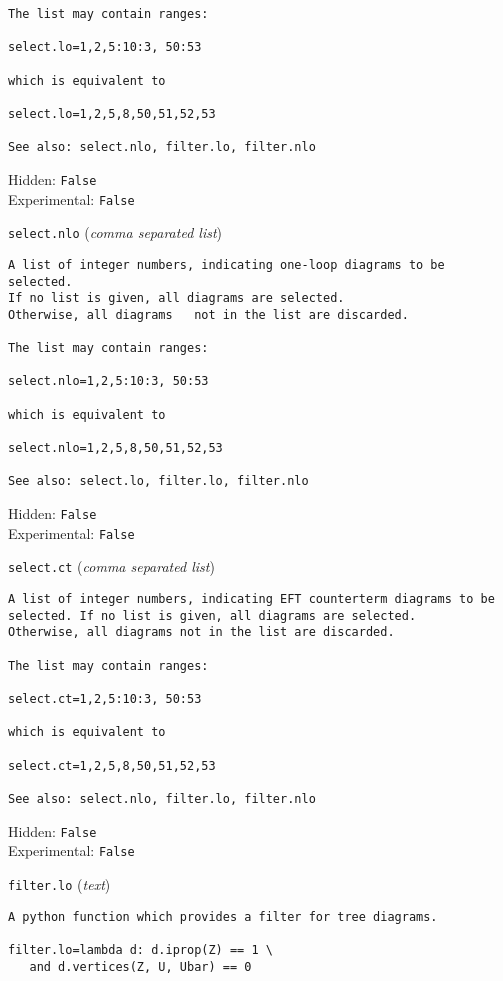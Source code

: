 \begin{basedescript}{\desclabelstyle{\pushlabel}}
\begin{verbatim}
The list may contain ranges:

select.lo=1,2,5:10:3, 50:53

which is equivalent to

select.lo=1,2,5,8,50,51,52,53

See also: select.nlo, filter.lo, filter.nlo
\end{verbatim}
Hidden: \verb|False|
\\Experimental: \verb|False|
\\\item[\colorbox{gray!30}{\texttt{select.nlo}}] (\textit{comma separated list})
\begin{verbatim}
A list of integer numbers, indicating one-loop diagrams to be selected.
If no list is given, all diagrams are selected.
Otherwise, all diagrams   not in the list are discarded.

The list may contain ranges:

select.nlo=1,2,5:10:3, 50:53

which is equivalent to

select.nlo=1,2,5,8,50,51,52,53

See also: select.lo, filter.lo, filter.nlo
\end{verbatim}
Hidden: \verb|False|
\\Experimental: \verb|False|
\\\item[\colorbox{gray!30}{\texttt{select.ct}}] (\textit{comma separated list})
\begin{verbatim}
A list of integer numbers, indicating EFT counterterm diagrams to be
selected. If no list is given, all diagrams are selected.
Otherwise, all diagrams not in the list are discarded.

The list may contain ranges:

select.ct=1,2,5:10:3, 50:53

which is equivalent to

select.ct=1,2,5,8,50,51,52,53

See also: select.nlo, filter.lo, filter.nlo
\end{verbatim}
Hidden: \verb|False|
\\Experimental: \verb|False|
\\\item[\colorbox{gray!30}{\texttt{filter.lo}}] (\textit{text})
\begin{verbatim}
A python function which provides a filter for tree diagrams.

filter.lo=lambda d: d.iprop(Z) == 1 \
   and d.vertices(Z, U, Ubar) == 0


\end{verbatim}
\end{basedescript}
